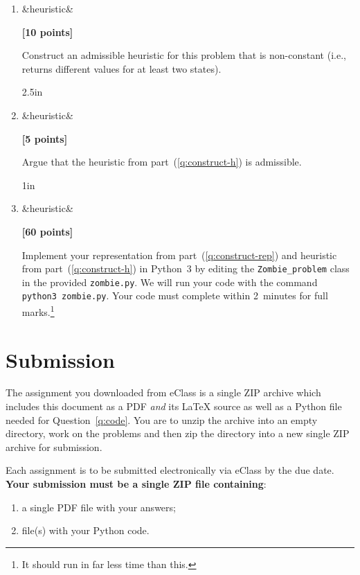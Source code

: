 \documentclass{article}
\newcounter{totalpoints}
\newcommand{\points}[2][]{{\addtocounter{totalpoints}{#2}\ifx&#1&\else\addtocounter{#1}{#2}\fi\textbf{[#2 points]}}}
\begin{document}
\begin{enumerate}
\begin{enumerate}
\begin{answer}{.75in}
\end{answer}


\item \points[heuristic]{10} \label{q:construct-h}
Construct an admissible heuristic for this problem that is non-constant (i.e., returns different values for at least two states).

\begin{answer}{2.5in}
\end{answer}


\item \points[heuristic]{5}
Argue that the heuristic from part~(\ref{q:construct-h}) is admissible.

\begin{answer}{1in}
\end{answer}

\item \points[heuristic]{60} \label{q:code}
Implement your representation from part~(\ref{q:construct-rep}) and heuristic from part~(\ref{q:construct-h}) in Python~3 by editing the \verb|Zombie_problem| class in the provided \texttt{zombie.py}.
We will run your code with the command \verb|python3 zombie.py|.
Your code must complete within 2~minutes for full marks.\footnote{It should run in far less time than this.}

\end{enumerate}


\end{enumerate}


\clearpage

\section*{Submission}
The assignment you downloaded from eClass is a single ZIP archive which includes this document as a PDF {\em and} its \LaTeX{} source as well as a Python file needed for Question~\ref{q:code}.
You are to unzip the archive into an empty directory, work on the problems and then zip the directory into a new single ZIP archive for submission.

\medskip

Each assignment is to be submitted electronically via eClass by the due date.
\textbf{Your submission must be a single ZIP file containing}:
\begin{enumerate}
\item a single PDF file with your answers;
\item file(s) with your Python code.
\end{enumerate}
\end{document}
